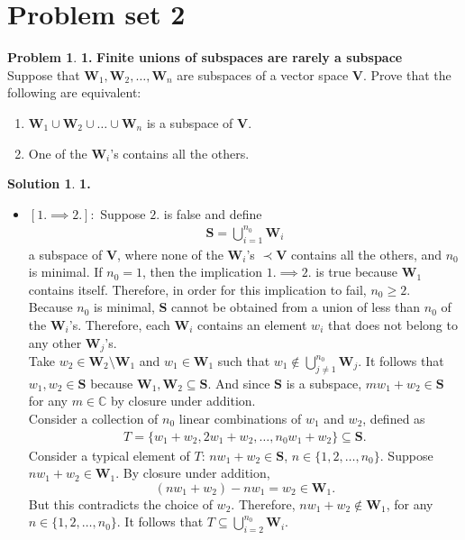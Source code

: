 \documentclass{book}
\theoremstyle{definition}
\newtheorem*{prob*}{Problem}
\newtheorem*{sln*}{Solution}
\newcommand{\V}{\mathbf{V}}
\newcommand{\W}{\mathbf{W}}
\begin{document}
\section{Problem set 2}
\begin{prob*}\textbf{1.}
	\textbf{Finite unions of subspaces are rarely a subspace}\\
	Suppose that $\W_1,\W_2,\dots,\W_n$ are subspaces of a vector space $\V$. Prove that the following are equivalent:
	\begin{enumerate}
		\item $\W_1 \cup \W_2\cup\dots\cup\W_n$ is a subspace of $\V$.
		\item One of the $\W_i$'s contains all the others. 
	\end{enumerate}
	
	
	\begin{sln*}\textbf{1.}
		$\,$
		\begin{itemize}
			\item $[1. \implies 2.]:$ Suppose $2.$ is false and define 
			\begin{align*}
			\mathbf{S} = \bigcup_{i=1}^{n_0}\W_i
			\end{align*}
			a subspace of $\V$, where none of the $\W_i$'s $\prec \V$ contains all the others, and $n_0$ is minimal. If $n_0=1$, then the implication $1. \implies 2.$ is true because $\W_1$ contains itself. Therefore, in order for this implication to fail, $n_0 \geq 2$.\\
			
			Because $n_0$ is minimal, $\mathbf{S}$ cannot be obtained from a union of less than $n_0$ of the $\W_i$'s. Therefore, each $\W_i$ contains an element $w_i$ that does not belong to any other $\W_j$'s.\\
			
			Take $w_2\in\W_2\setminus \W_1$ and $w_1 \in \W_1$ such that $w_1 \notin \bigcup_{j\neq 1}^{n_0}\W_j$. It follows that $w_1, w_2 \in \mathbf{S}$ because $\W_1, \W_2 \subseteq \mathbf{S}$. And since $\mathbf{S}$ is a subspace, $mw_1 + w_2 \in \mathbf{S}$ for any $m\in\mathbb{C}$ by closure under addition. \\
			
			Consider a collection of $n_0$ linear combinations of $w_1$ and $w_2$, defined as
			\begin{align*}
			T = \{ w_1+w_2,2w_1+w_2,\dots,n_0 w_1 + w_2\} \subseteq \mathbf{S}.
			\end{align*}
			Consider a typical element of $T$: $n w_1 + w_2 \in \mathbf{S}$, $n\in\{1,2,\dots,n_0\}$. Suppose $n w_1 + w_2 \in \W_1$. By closure under addition, $$(nw_1 + w_2) - nw_1 = w_2\in \W_1.$$ But this contradicts the choice of $w_2$. Therefore, $nw_1 + w_2 \notin \W_1$, for any $n\in\{1,2,\dots,n_0\}$. It follows that $T \subseteq \bigcup_{i=2}^{n_0} \W_i$. \\
			

\end{itemize}
\end{sln*}
\end{prob*}
\end{document}
